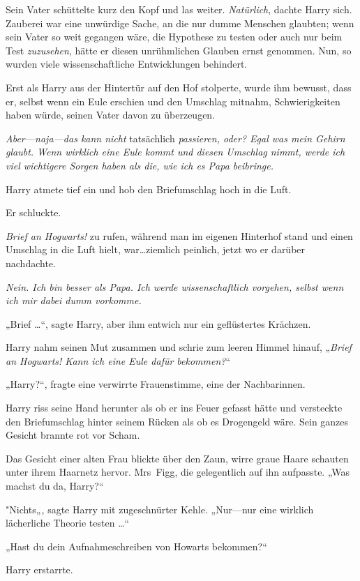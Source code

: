 {Sein Vater schüttelte kurz den Kopf und las weiter. \emph{Natürlich}, dachte Harry sich. Zauberei war eine unwürdige Sache, an die nur dumme Menschen glaubten; wenn sein Vater so weit gegangen wäre, die Hypothese zu testen oder auch nur beim Test \emph{zuzusehen}, hätte er diesen unrühmlichen Glauben ernst genommen. Nun, so wurden viele wissenschaftliche Entwicklungen behindert.

Erst als Harry aus der Hintertür auf den Hof stolperte, wurde ihm bewusst, dass er, selbst wenn ein Eule erschien und den Umschlag mitnahm, Schwierigkeiten haben würde, seinen Vater davon zu überzeugen.

\emph{Aber—naja—das kann nicht} tatsächlich \emph{passieren, oder? Egal was mein Gehirn glaubt. Wenn wirklich eine Eule kommt und diesen Umschlag nimmt, werde ich viel wichtigere Sorgen haben als die, wie ich es Papa beibringe.}

Harry atmete tief ein und hob den Briefumschlag hoch in die Luft.

Er schluckte.

\emph{Brief an Hogwarts!} zu rufen, während man im eigenen Hinterhof stand und einen Umschlag in die Luft hielt, war…ziemlich peinlich, jetzt wo er darüber nachdachte.

\emph{Nein. Ich bin besser als Papa. Ich werde wissenschaftlich vorgehen, selbst wenn ich mir dabei dumm vorkomme.}

„Brief …“, sagte Harry, aber ihm entwich nur ein geflüstertes Krächzen.

Harry nahm seinen Mut zusammen und schrie zum leeren Himmel hinauf, „\emph{Brief an Hogwarts! Kann ich eine Eule dafür bekommen?}“

„Harry?“, fragte eine verwirrte Frauenstimme, eine der Nachbarinnen.

Harry riss seine Hand herunter als ob er ins Feuer gefasst hätte und versteckte den Briefumschlag hinter seinem Rücken als ob es Drogengeld wäre. Sein ganzes Gesicht brannte rot vor Scham.

Das Gesicht einer alten Frau blickte über den Zaun, wirre graue Haare schauten unter ihrem Haarnetz hervor. Mrs~Figg, die gelegentlich auf ihn aufpasste. „Was machst du da, Harry?“

"Nichts„, sagte Harry mit zugeschnürter Kehle. „Nur—nur eine wirklich lächerliche Theorie testen …“

„Hast du dein Aufnahmeschreiben von Howarts bekommen?“

Harry erstarrte.

}
